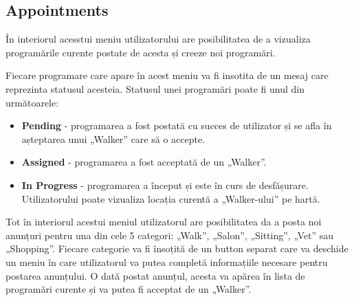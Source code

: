 \subsection{Appointments}

În interiorul acesstui meniu utilizatorului are posibilitatea de a vizualiza programările curente postate de acesta și creeze noi programări. 
 
Fiecare programare care apare în acest meniu va fi insotita de un mesaj care reprezinta statusul acesteia. Statusul unei programări poate fi unul din următoarele:

\begin{itemize}
    \item \textbf{Pending} - programarea a fost postată cu succes de utilizator și se afla în așteptarea unui „Walker” care să o accepte.
    \item \textbf{Assigned} - programarea a fost acceptată de un „Walker”.
    \item \textbf{In Progress} - programarea a început și este în curs de desfășurare. Utilizatorului poate vizualiza locația curentă a „Walker-ului” pe hartă.
\end{itemize}

Tot în interiorul acestui meniul utilizatorul are posibilitatea da a posta noi anunțuri pentru una din cele 5 categori: „Walk”, „Salon”, „Sitting”, „Vet” sau „Shopping”. Fiecare categorie va fi însoțită de un button separat care va deschide un meniu în care utilizatorul va putea completă informațiile necesare pentru postarea anunțului. O dată postat anunțul, acesta va apărea în lista de programări curente și va putea fi acceptat de un „Walker”. 

